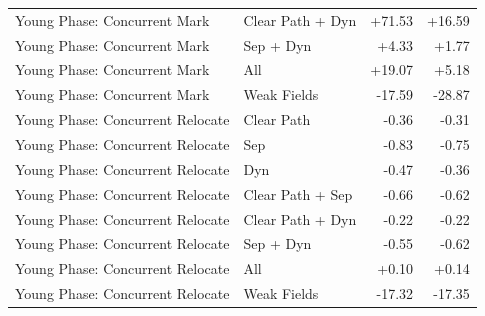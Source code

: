 \begin{table}[t]
\begin{tabular}{llrr}
Young Phase: Concurrent Mark & Clear Path + Dyn & +71.53 & +16.59 \\
Young Phase: Concurrent Mark & Sep + Dyn & +4.33 & +1.77 \\
Young Phase: Concurrent Mark & All & +19.07 & +5.18 \\
Young Phase: Concurrent Mark & Weak Fields & -17.59 & -28.87 \\
Young Phase: Concurrent Relocate & Clear Path & -0.36 & -0.31 \\
Young Phase: Concurrent Relocate & Sep & -0.83 & -0.75 \\
Young Phase: Concurrent Relocate & Dyn & -0.47 & -0.36 \\
Young Phase: Concurrent Relocate & Clear Path + Sep & -0.66 & -0.62 \\
Young Phase: Concurrent Relocate & Clear Path + Dyn & -0.22 & -0.22 \\
Young Phase: Concurrent Relocate & Sep + Dyn & -0.55 & -0.62 \\
Young Phase: Concurrent Relocate & All & +0.10 & +0.14 \\
Young Phase: Concurrent Relocate & Weak Fields & -17.32 & -17.35 \\
\bottomrule
\end{tabular}
\end{table}
